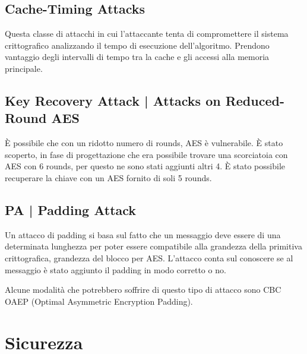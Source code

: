\subsection{Cache-Timing Attacks}

   

\textsf{\small Questa classe di attacchi in cui l'attaccante tenta di compromettere il sistema crittografico analizzando il tempo di esecuzione dell'algoritmo. Prendono vantaggio degli intervalli di tempo tra la cache e gli accessi alla memoria principale.}

\subsection{Key Recovery Attack | Attacks on Reduced-Round AES}

   

\textsf{\small È possibile che con un ridotto numero di rounds, AES è vulnerabile. È stato scoperto, in fase di progettazione che era possibile trovare una scorciatoia con AES con 6 rounds, per questo ne sono stati aggiunti altri 4. È stato possibile recuperare la chiave con un AES fornito di soli 5 rounds.}

\subsection{PA | Padding Attack}

   

\textsf{\small Un attacco di padding si basa sul fatto che un messaggio deve essere di una determinata lunghezza per poter essere compatibile alla grandezza della primitiva crittografica, grandezza del blocco per AES. L'attacco conta sul conoscere se al messaggio è stato aggiunto il padding in modo corretto o no.}

 

\textsf{\small Alcune modalità che potrebbero soffrire di questo tipo di attacco sono CBC OAEP (Optimal Asymmetric Encryption Padding).} %


\section{Sicurezza}

